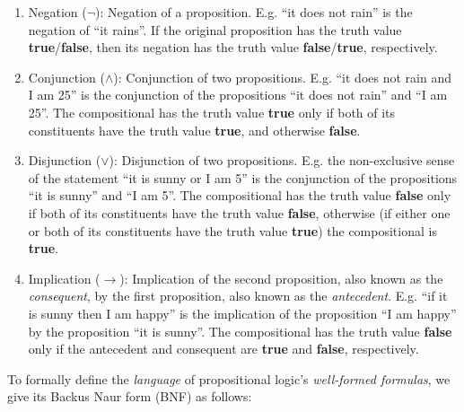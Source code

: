 \documentclass{article}
\newcommand{\imp}{\ensuremath{\rightarrow}}
\newcommand{\true}{\textbf{true}}
\newcommand{\false}{\textbf{false}}
\begin{document}
\begin{enumerate}
	\item Negation ($\neg$): Negation of a proposition. E.g.
		``it does not rain'' is the negation of ``it rains''.
		If the original proposition has the truth value
		\true{}/\false{}, then its negation has the truth value
		\false{}/\true{}, respectively.
	\item Conjunction ($\land$): Conjunction of two propositions. E.g.
		``it does not rain and I am 25'' is the conjunction of the propositions
		``it does not rain'' and ``I am 25''. The compositional has
		the truth value \true{} only if both of its constituents
		have the truth value \true{}, and otherwise \false{}.
	\item Disjunction ($\lor$): Disjunction of two propositions. E.g.
		the non-exclusive sense of the statement
		``it is sunny or I am 5'' is the conjunction of the propositions
		``it is sunny'' and ``I am 5''. The compositional has the truth
		value \false{} only if both of its constituents have the truth
		value \false{}, otherwise (if either one or both of its constituents
		have the truth value \true{}) the compositional is \true{}.
	\item Implication ($\imp$): Implication of the second proposition,
		also known as the \textit{consequent}, by the first proposition,
		also known as the \textit{antecedent}. E.g.
		``if it is sunny then I am happy'' is the implication of
		the proposition ``I am happy'' by the proposition ``it is sunny''.
		The compositional has the truth value \false{} only if the
		antecedent and consequent are \true{} and \false{}, respectively.
\end{enumerate}

To formally define the \textit{language} of propositional logic's
\textit{well-formed formulas}, we give its Backus Naur form (BNF)
as follows:

\begin{bnf*}
	\bnfprod{$\phi$}
	{
		 \bnfor
		\bnfts{$\Big(\neg$} \bnfpn{$\phi$} \bnfts{$\Big)$} \bnfor
		\bnfts{$\Big($} \bnfpn{$\phi$} \bnfts{$\land$}
			\bnfpn{$\phi$} \bnfts{$\Big)$} \bnfor
		\bnfts{$\Big($} \bnfpn{$\phi$} \bnfts{$\lor$}
			\bnfpn{$\phi$} \bnfts{$\Big)$} \bnfor
		\bnfts{$\Big($} \bnfpn{$\phi$} \bnfts{$\imp$}
			\bnfpn{$\phi$} \bnfts{$\Big)$}
	}\\
	{
		 \bnfor {} \bnfor \bnfts{\bnfsk} \bnfor
		 \bnfor {} \bnfor \bnfts{\bnfsk}
	}
\end{bnf*}
\end{document}
